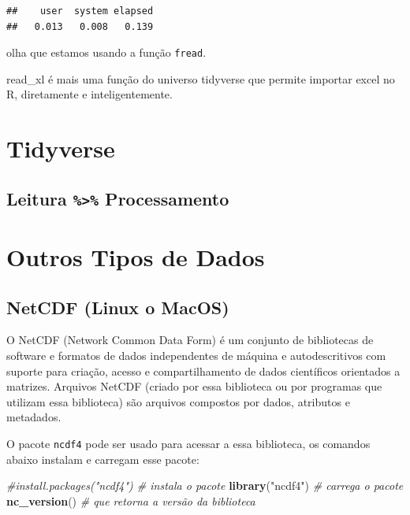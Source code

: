 \documentclass[]{book}
\newenvironment{Shaded}{\begin{snugshade}}{\end{snugshade}}
\newcommand{\KeywordTok}[1]{\textcolor[rgb]{0.13,0.29,0.53}{\textbf{#1}}}
\newcommand{\StringTok}[1]{\textcolor[rgb]{0.31,0.60,0.02}{#1}}
\newcommand{\CommentTok}[1]{\textcolor[rgb]{0.56,0.35,0.01}{\textit{#1}}}
\newcommand{\NormalTok}[1]{#1}
\theoremstyle{definition}
\theoremstyle{definition}
\theoremstyle{definition}
\theoremstyle{remark}
\begin{document}
\begin{verbatim}
##    user  system elapsed 
##   0.013   0.008   0.139
\end{verbatim}

olha que estamos usando a função \texttt{fread}.

read\_xl é mais uma função do universo tidyverse que permite importar
excel no R, diretamente e inteligentemente.

\section{Tidyverse}\label{tidyverse}

\subsection{\texorpdfstring{Leitura \texttt{\%\textgreater{}\%}
Processamento}{Leitura \%\textgreater{}\% Processamento}}\label{leitura-processamento}

\section{Outros Tipos de Dados}\label{outros-tipos-de-dados}

\subsection{NetCDF (Linux o MacOS)}\label{netcdf-linux-o-macos}

O NetCDF (Network Common Data Form) é um conjunto de bibliotecas de
software e formatos de dados independentes de máquina e autodescritivos
com suporte para criação, acesso e compartilhamento de dados científicos
orientados a matrizes. Arquivos NetCDF (criado por essa biblioteca ou
por programas que utilizam essa biblioteca) são arquivos compostos por
dados, atributos e metadados.

O pacote \texttt{ncdf4} pode ser usado para acessar a essa biblioteca,
os comandos abaixo instalam e carregam esse pacote:

\begin{Shaded}
\begin{Highlighting}[]
\CommentTok{#install.packages("ncdf4") # instala o pacote}
\KeywordTok{library}\NormalTok{(}\StringTok{"ncdf4"}\NormalTok{)          }\CommentTok{# carrega o pacote}
\KeywordTok{nc_version}\NormalTok{()              }\CommentTok{# que retorna a versão da biblioteca}
\end{Highlighting}
\end{Shaded}
\end{document}
